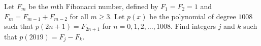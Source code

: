 Let $F_m$ be the $m$th Fibonacci number, defined by $F_1 = F_2 = 1$ and $F_m = F_{m-1} + F_{m-2}$ for all $m \geq 3$.
Let $p(x)$ be the polynomial of degree $1008$ such that $p(2n+1) = F_{2n+1}$ for $n=0,1,2,\dots,1008$. Find integers $j$ and $k$ such that $p(2019) = F_j - F_k$.
